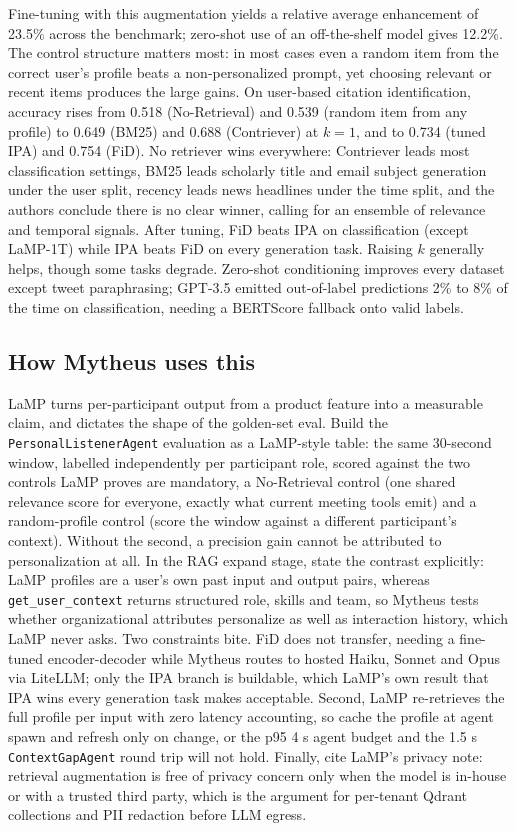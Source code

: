 Fine-tuning with this augmentation yields a relative average enhancement of 23.5\% across the benchmark; zero-shot use of an off-the-shelf model gives 12.2\%. The control structure matters most: in most cases even a random item from the correct user's profile beats a non-personalized prompt, yet choosing relevant or recent items produces the large gains. On user-based citation identification, accuracy rises from 0.518 (No-Retrieval) and 0.539 (random item from any profile) to 0.649 (BM25) and 0.688 (Contriever) at $k=1$, and to 0.734 (tuned IPA) and 0.754 (FiD). No retriever wins everywhere: Contriever leads most classification settings, BM25 leads scholarly title and email subject generation under the user split, recency leads news headlines under the time split, and the authors conclude there is no clear winner, calling for an ensemble of relevance and temporal signals. After tuning, FiD beats IPA on classification (except LaMP-1T) while IPA beats FiD on every generation task. Raising $k$ generally helps, though some tasks degrade. Zero-shot conditioning improves every dataset except tweet paraphrasing; GPT-3.5 emitted out-of-label predictions 2\% to 8\% of the time on classification, needing a BERTScore fallback onto valid labels.

\subsection{How Mytheus uses this}
\begin{takeaway}
LaMP turns per-participant output from a product feature into a measurable claim, and dictates the shape of the golden-set eval. Build the \texttt{PersonalListenerAgent} evaluation as a LaMP-style table: the same 30-second window, labelled independently per participant role, scored against the two controls LaMP proves are mandatory, a No-Retrieval control (one shared relevance score for everyone, exactly what current meeting tools emit) and a random-profile control (score the window against a different participant's context). Without the second, a precision gain cannot be attributed to personalization at all. In the RAG expand stage, state the contrast explicitly: LaMP profiles are a user's own past input and output pairs, whereas \texttt{get\_user\_context} returns structured role, skills and team, so Mytheus tests whether organizational attributes personalize as well as interaction history, which LaMP never asks. Two constraints bite. FiD does not transfer, needing a fine-tuned encoder-decoder while Mytheus routes to hosted Haiku, Sonnet and Opus via LiteLLM; only the IPA branch is buildable, which LaMP's own result that IPA wins every generation task makes acceptable. Second, LaMP re-retrieves the full profile per input with zero latency accounting, so cache the profile at agent spawn and refresh only on change, or the p95 4 s agent budget and the 1.5 s \texttt{ContextGapAgent} round trip will not hold. Finally, cite LaMP's privacy note: retrieval augmentation is free of privacy concern only when the model is in-house or with a trusted third party, which is the argument for per-tenant Qdrant collections and PII redaction before LLM egress.
\end{takeaway}

